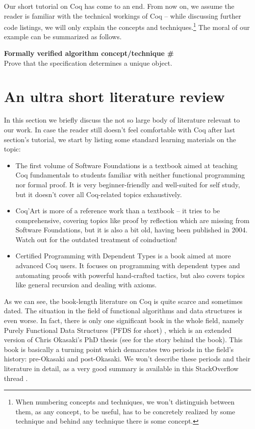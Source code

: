 \documentclass[declaration,mgr,english,shortabstract]{iithesis}
\newcounter{cnt}
\newcommand{\runcnt}{\#\arabic{cnt}}
\newcommand{\concept}[1]
{
    \refstepcounter{cnt}
    \begin{center}
        \textbf{Formally verified algorithm concept/technique \runcnt} \\
        #1
    \end{center}
}
\begin{document}
Our short tutorial on Coq has come to an end. From now on, we assume the reader is familiar with the technical workings of Coq -- while discussing further code listings, we will only explain the concepts and techniques.\footnote{When numbering concepts and techniques, we won't distinguish between them, as any concept, to be useful, has to be concretely realized by some technique and behind any technique there is some concept.} The moral of our example can be summarized as follows.

\concept{Prove that the specification determines a unique object.}

\section{An ultra short literature review} \label{literature}

In this section we briefly discuss the not so large body of literature relevant to our work. In case the reader still doesn't feel comfortable with Coq after last section's tutorial, we start by listing some standard learning materials on the topic:

\begin{itemize}
    \item The first volume of Software Foundations \cite{SoftwareFoundations} is a textbook aimed at teaching Coq fundamentals to students familiar with neither functional programming nor formal proof. It is very beginner-friendly and well-suited for self study, but it doesn't cover all Coq-related topics exhaustively.
    \item Coq'Art \cite{CoqArt} is more of a reference work than a textbook -- it tries to be comprehensive, covering topics like proof by reflection which are missing from Software Foundations, but it is also a bit old, having been published in 2004. Watch out for the outdated treatment of coinduction!
    \item Certified Programming with Dependent Types \cite{CPDT} is a book aimed at more advanced Coq users. It focuses on programming with dependent types and automating proofs with powerful hand-crafted tactics, but also covers topics like general recursion and dealing with axioms.
\end{itemize}

As we can see, the book-length literature on Coq is quite scarce and sometimes dated. The situation in the field of functional algorithms and data structures is even worse. In fact, there is only one significant book in the whole field, namely Purely Functional Data Structures (PFDS for short) \cite{Okasaki}, which is an extended version of Chris Okasaki's PhD thesis \cite{OkasakiPhD} (see \cite{Okasaki10YearsLater} for the story behind the book). This book is basically a turning point which demarcates two periods in the field's history: pre-Okasaki and post-Okasaki. We won't describe these periods and their literature in detail, as a very good summary is available in this StackOverflow thread \cite{SinceOkasaki}.
\end{document}
